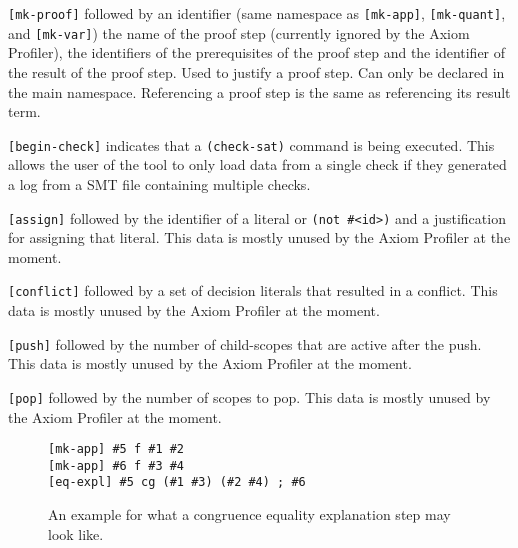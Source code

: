 \documentclass[orivec]{llncs}
\begin{document}
\texttt{[mk-proof]} followed by an identifier (same namespace as \texttt{[mk-app]}, \texttt{[mk-quant]}, and \texttt{[mk-var]}) the name of the proof step (currently ignored by the Axiom Profiler), the identifiers of the prerequisites of the proof step and the identifier of the result of the proof step. Used to justify a proof step. Can only be declared in the main namespace. Referencing a proof step is the same as referencing its result term.

\texttt{[begin-check]} indicates that a \texttt{(check-sat)} command is being executed. This allows the user of the tool to only load data from a single check if they generated a log from a SMT file containing multiple checks.

\texttt{[assign]} followed by the identifier of a literal or \texttt{(not \#<id>)} and a justification for assigning that literal. This data is mostly unused by the Axiom Profiler at the moment.

\texttt{[conflict]} followed by a set of decision literals that resulted in a conflict. This data is mostly unused by the Axiom Profiler at the moment.

\texttt{[push]} followed by the number of child-scopes that are active after the push. This data is mostly unused by the Axiom Profiler at the moment.

\texttt{[pop]} followed by the number of scopes to pop. This data is mostly unused by the Axiom Profiler at the moment.

\begin{figure}[t]
\begin{lstlisting}
[mk-app] #5 f #1 #2
[mk-app] #6 f #3 #4
[eq-expl] #5 cg (#1 #3) (#2 #4) ; #6
\end{lstlisting}
\caption{An example for what a congruence equality explanation step may look like.}
\label{fig:congruence_step_log}
\end{figure}
\end{document}
